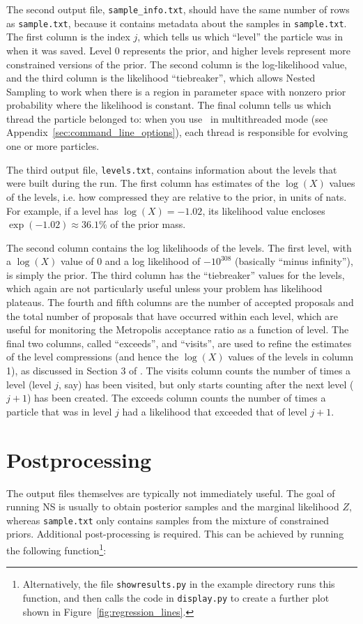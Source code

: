 \documentclass[article, nojss]{jss}
\newcommand{\dnest}{\pkg{DNest4}}
\begin{document}
The second output file, {\tt sample\_info.txt}, should have the same number of
rows as {\tt sample.txt}, because it contains metadata about the samples in
{\tt sample.txt}. The first
column is the index $j$, which tells us which ``level'' the particle was in
when it was saved. Level 0 represents the prior, and higher levels represent
more constrained versions of the prior.
The second column is the log-likelihood value, and the third column is
the likelihood ``tiebreaker'', which allows Nested Sampling to work when
there is a region in parameter space with nonzero prior probability where the
likelihood is constant. The final column tells us which thread the particle
belonged to: when you use \dnest~in multithreaded mode
(see Appendix~\ref{sec:command_line_options}), each thread
is responsible for evolving one or more particles.

The third output file, {\tt levels.txt}, contains information about the levels
that were built during the run. The first column has estimates of the $\log(X)$
values of the levels, i.e. how compressed they are relative to the prior, in
units of nats. For example, if a level has $\log(X) = -1.02$, its likelihood
value encloses $\exp(-1.02) \approx 36.1\%$ of the prior mass.

The second column contains the log likelihoods of the levels.
The first level, with a $\log(X)$ value of 0 and a log likelihood of
$-10^{308}$ (basically ``minus infinity''), is simply the prior. The third
column has the ``tiebreaker'' values for the levels, which again are not
particularly useful unless your problem has likelihood plateaus. The fourth
and fifth columns are the number of accepted proposals and the total number
of proposals that have occurred within each level, which are useful for
monitoring the Metropolis acceptance ratio as a function of level.
The final two columns, called ``exceeds'', and ``visits'', are used to refine
the estimates of the level compressions (and hence the $\log(X)$ values of
the levels in column 1), as discussed in Section 3 of
\citet{brewer2011diffusive}.
The visits column counts the number of times a level (level $j$, say)
has been visited, but only starts counting after the next level ($j+1$) has been created. The exceeds column counts the number of times a particle that was
in level $j$ had a likelihood that exceeded that of level $j+1$.

\section{Postprocessing}\label{sec:postprocessing}
The output files themselves are typically not immediately useful.
The goal of running
NS is usually to obtain posterior samples and the marginal likelihood $Z$,
whereas {\tt sample.txt} only contains samples from the mixture of constrained
priors. Additional
post-processing is required. This can be achieved by running the following
 function\footnote{Alternatively, the file
{\tt showresults.py} in the example directory runs this function, and then
calls the code in {\tt display.py} to create a further plot shown in
Figure~\ref{fig:regression_lines}.}:
\end{document}
